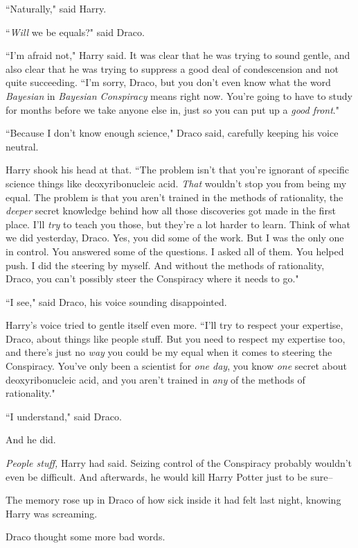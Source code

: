 ``Naturally," said Harry.

``\emph{Will} we be equals?" said Draco.

``I'm afraid not," Harry said. It was clear that he was trying to sound gentle, and also clear that he was trying to suppress a good deal of condescension and not quite succeeding. ``I'm sorry, Draco, but you don't even know what the word \emph{Bayesian} in \emph{Bayesian Conspiracy} means right now. You're going to have to study for months before we take anyone else in, just so you can put up a \emph{good front}."

``Because I don't know enough science," Draco said, carefully keeping his voice neutral.

Harry shook his head at that. ``The problem isn't that you're ignorant of specific science things like deoxyribonucleic acid. \emph{That} wouldn't stop you from being my equal. The problem is that you aren't trained in the methods of rationality, the \emph{deeper} secret knowledge behind how all those discoveries got made in the first place. I'll \emph{try} to teach you those, but they're a lot harder to learn. Think of what we did yesterday, Draco. Yes, you did some of the work. But I was the only one in control. You answered some of the questions. I asked all of them. You helped push. I did the steering by myself. And without the methods of rationality, Draco, you can't possibly steer the Conspiracy where it needs to go."

``I see," said Draco, his voice sounding disappointed.

Harry's voice tried to gentle itself even more. ``I'll try to respect your expertise, Draco, about things like people stuff. But you need to respect my expertise too, and there's just no \emph{way} you could be my equal when it comes to steering the Conspiracy. You've only been a scientist for \emph{one day}, you know \emph{one} secret about deoxyribonucleic acid, and you aren't trained in \emph{any} of the methods of rationality."

``I understand," said Draco.

And he did.

\emph{People stuff,} Harry had said. Seizing control of the Conspiracy probably wouldn't even be difficult. And afterwards, he would kill Harry Potter just to be sure\---

The memory rose up in Draco of how sick inside it had felt last night, knowing Harry was screaming.

Draco thought some more bad words.


